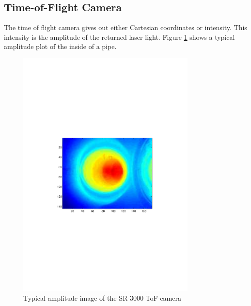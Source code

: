 \subsection{Time-of-Flight Camera}
The time of flight camera gives out either Cartesian coordinates or intensity. This
intensity is the amplitude of the returned laser light. Figure
\ref{chap3:fig-tof-amppicture} shows a typical amplitude plot of the inside of a pipe.
\begin{figure}[htbp]
    \centering
    \includegraphics[width=0.8\textwidth]{pics/tof-amppicture}
    \caption{Typical amplitude image of the SR-3000 ToF-camera}
    \label{chap3:fig-tof-amppicture}
\end{figure}



